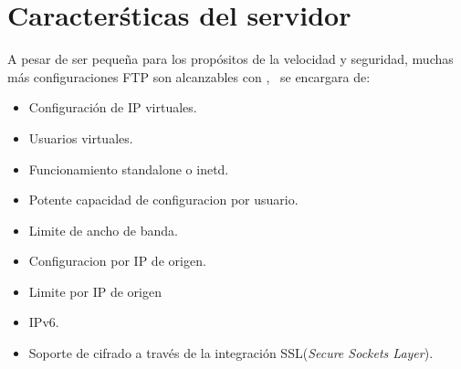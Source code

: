 \section{Caracter\'sticas del servidor}
  A pesar de ser peque\~na para los prop\'ositos de la velocidad y seguridad, muchas m\'as 
  configuraciones FTP son alcanzables con \vsftpd, \vsftpd\ se encargara de:
  \begin{itemize}
    \item Configuración de IP virtuales.
    \item Usuarios virtuales.
    \item Funcionamiento standalone o inetd.
    \item Potente capacidad de configuracion por usuario.
    \item Limite de ancho de banda.
    \item Configuracion por IP de origen.
    \item Limite por IP de origen
    \item IPv6.
    \item Soporte de cifrado a través de la integración SSL({\em Secure Sockets Layer}).
  \end{itemize}
  

